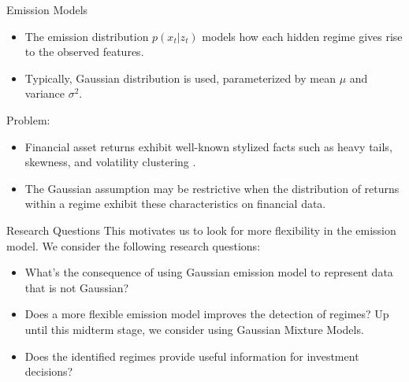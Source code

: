 \begin{frame}{Emission Models}
\begin{itemize}
    \item The emission distribution $p(x_t|z_t)$ models how each hidden regime gives rise to the observed features.
    \item Typically, Gaussian distribution is used, parameterized by mean $\mu$ and variance $\sigma^2$.
\end{itemize}

Problem:
\begin{itemize}
    \item Financial asset returns exhibit well-known stylized facts such as heavy tails, skewness, and volatility clustering \cite{rcont2001}.
    \item  The Gaussian assumption may be restrictive when the distribution of returns within a regime exhibit these characteristics on financial data.
\end{itemize}
\end{frame}

\begin{frame}{Research Questions}
This motivates us to look for more flexibility in the emission model. We consider the following research questions:
\begin{itemize}
    \item What's the consequence of using Gaussian emission model to represent data that is not Gaussian?
    \item Does a more flexible emission model improves the detection of regimes? Up until this midterm stage, we consider using Gaussian Mixture Models.
    \item Does the identified regimes provide useful information for investment decisions?
\end{itemize}
\end{frame}

